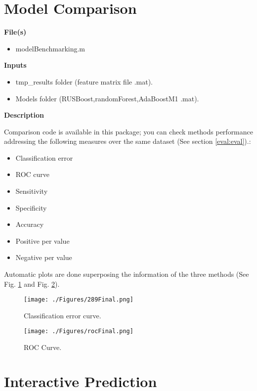 \section{Model Comparison}

\textbf{File(s)}
\begin{itemize}
\item modelBenchmarking.m
\end{itemize}

\textbf{Inputs}
\begin{itemize}
\item tmp\_results folder (feature matrix file \* .mat).
\item Models folder (RUSBoost,randomForest,AdaBoostM1 .mat).
\end{itemize}

\textbf{Description}

Comparison code is available in this package; you can check methods performance addressing the following measures over the same dataset (See section \ref{eval:eval}).:

\begin{itemize}
\item Classification error
\item ROC curve
\item Sensitivity
\item Specificity
\item Accuracy
\item Positive per value
\item Negative per value
\end{itemize}

Automatic plots are done superposing the information of the three methods (See Fig. \ref{fig:errcurve} and Fig. \ref{fig:roccurve}).

\begin{figure}[ht]
	\centering
		\texttt{[image: ./Figures/289Final.png]}
	\caption[Classification Curve]{Classification error curve.}
	\label{fig:errcurve}
\end{figure}

\begin{figure}[ht]
	\centering
		\texttt{[image: ./Figures/rocFinal.png]}
	\caption[ROC Curve]{ROC Curve.}
	\label{fig:roccurve}
\end{figure}

\section{Interactive Prediction}

